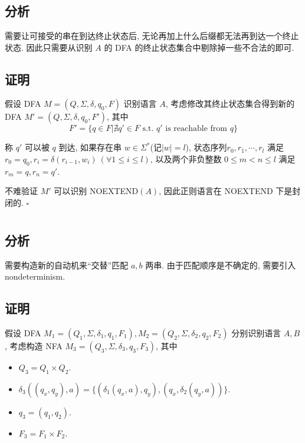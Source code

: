 \documentclass[8pt]{article}
\theoremstyle{compact}
\def\le{\leqslant}
\begin{document}
\section{}
\subsection*{分析}
	需要让可接受的串在到达终止状态后, 无论再加上什么后缀都无法再到达一个终止状态. 因此只需要从识别 $A$ 的 DFA 的终止状态集合中剔除掉一些不合法的即可.
\subsection*{证明}
	假设 DFA $M = (Q, \Sigma, \delta, q_0, F)$ 识别语言 $A$, 考虑修改其终止状态集合得到新的 DFA $M' = (Q, \Sigma, \delta, q_0, F')$, 其中
	$$F' = \{q \in F | \nexists q' \in F \text{ s.t. }q'\text{ is reachable from }q\}$$

	称 $q'$ 可以被 $q$ 到达, 如果存在串 $w \in \Sigma^*$(记$|w| = l$), 状态序列$r_0, r_1, \cdots, r_l$ 满足 $r_0 = q_0, r_{i} = \delta(r_{i-1}, w_i)\ (\forall 1 \le i \le l)$, 以及两个非负整数 $0 \le m < n \le l$ 满足 $r_{m} = q, r_{n} = q'$.

	不难验证 $M'$ 可以识别 \textsf{NOEXTEND}$(A)$, 因此正则语言在 \textsf{NOEXTEND} 下是封闭的. \hfill $\square$ 

\section{}
\subsection*{分析}
	需要构造新的自动机来“交替”匹配 $a, b$ 两串. 由于匹配顺序是不确定的, 需要引入 nondeterminism.
\subsection*{证明}
	假设 DFA $M_1 = (Q_1, \Sigma, \delta_1, q_1, F_1), M_2 = (Q_2, \Sigma, \delta_2, q_2, F_2)$ 分别识别语言 $A, B$, 考虑构造 NFA $M_3 = (Q_3, \Sigma, \delta_3, q_3, F_3)$, 其中
	\begin{itemize}
		\item $Q_3 = Q_1 \times Q_2$.
		\item $\delta_3((q_x, q_y), a) = \{(\delta_1(q_x, a), q_y), (q_x, \delta_2(q_y, a))\}$.
		\item $q_3 = (q_1, q_2)$.
		\item $F_3 = F_1 \times F_2$.
	\end{itemize}
\end{document}
